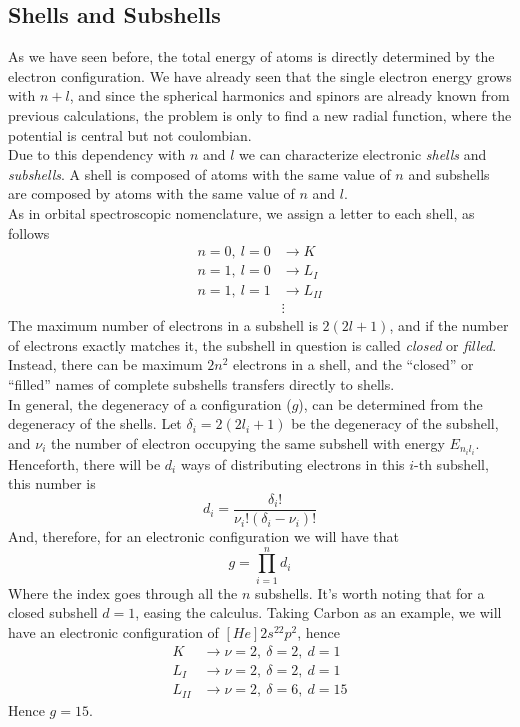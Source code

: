 \documentclass[a4paper, 11pt]{book}
\newcommand{\1}{\opr{\mathds{1}}}
\theoremstyle{plain}
\begin{document}
	\subsection{Shells and Subshells}
	As we have seen before, the total energy of atoms is directly determined by the electron configuration. We have already seen that the single electron energy grows with $n+l$, and since the spherical harmonics and spinors are already known from previous calculations, the problem is only to find a new radial function, where the potential is central but not coulombian.\\
	Due to this dependency with $n$ and $l$ we can characterize electronic \textit{shells} and \textit{subshells}. A shell is composed of atoms with the same value of $n$ and subshells are composed by atoms with the same value of $n$ and $l$.\\
	As in orbital spectroscopic nomenclature, we assign a letter to each shell, as follows
	\begin{equation}
		\begin{aligned}
			n=0,\ l=0&\longrightarrow K\\
			n=1,\ l=0&\longrightarrow L_I\\
			n=1,\ l=1&\longrightarrow L_{II}\\
			&\vdots
		\end{aligned}
		\label{eq:shellsandsubshells}
	\end{equation}
	The maximum number of electrons in a subshell is $2(2l+1)$, and if the number of electrons exactly matches it, the subshell in question is called \textit{closed} or \textit{filled}.\\
	Instead, there can be maximum $2n^2$ electrons in a shell, and the ``closed'' or ``filled'' names of complete subshells transfers directly to shells.\\
	In general, the degeneracy of a configuration ($g$), can be determined from the degeneracy of the shells. Let $\delta_i=2(2l_i+1)$ be the degeneracy of the subshell, and $\nu_i$ the number of electron occupying the same subshell with energy $E_{n_il_i}$. Henceforth, there will be $d_i$ ways of distributing electrons in this $i$-th subshell, this number is
	\begin{equation}
		d_i=\frac{\delta_i!}{\nu_i!\left( \delta_i-\nu_i \right)!}
		\label{eq:subshelldegeneracy}
	\end{equation}
	And, therefore, for an electronic configuration we will have that
	\begin{equation*}
		g=\prod_{i=1}^nd_i
	\end{equation*}
	Where the index goes through all the $n$ subshells. It's worth noting that for a closed subshell $d=1$, easing the calculus. Taking Carbon as an example, we will have an electronic configuration of $[He]2s^22p^2$, hence
	\begin{equation}
		\begin{aligned}
			K&\rightarrow\nu=2,\ \delta=2,\ d=1\\
			L_I&\rightarrow\nu=2,\ \delta=2,\ d=1\\
			L_{II}&\rightarrow\nu=2,\ \delta=6,\ d=15
		\end{aligned}
		\label{eq:carbondegeneracy}
	\end{equation}
	Hence $g=15$.
\end{document}
